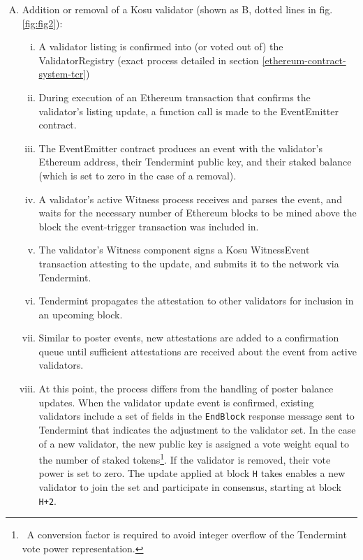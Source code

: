\documentclass[10pt]{article}
\begin{document}
\begin{enumerate}[A.]
\begin{enumerate}[i.]
  \end{enumerate}
  \item Addition or removal of a Kosu validator (shown as B, dotted lines in fig. \ref{fig:fig2}):
  \begin{enumerate}[i.]
    \item A validator listing is confirmed into (or voted out of) the ValidatorRegistry (exact process detailed in section \ref{ethereum-contract-system-tcr})
    \item During execution of an Ethereum transaction that confirms the validator’s listing update, a function call is made to the EventEmitter contract.
    \item The EventEmitter contract produces an event with the validator’s Ethereum address, their Tendermint public key, and their staked balance (which is set to zero in the case of a removal).
    \item A validator’s active Witness process receives and parses the event, and waits for the necessary number of Ethereum blocks to be mined above the block the event-trigger transaction was included in.
    \item The validator’s Witness component signs a Kosu WitnessEvent transaction attesting to the update, and submits it to the network via Tendermint.
    \item Tendermint propagates the attestation to other validators for inclusion in an upcoming block. 
    \item Similar to poster events, new attestations are added to a confirmation queue until sufficient attestations are received about the event from active validators.
    \item At this point, the process differs from the handling of poster balance updates. When the validator update event is confirmed, existing validators include a set of fields in the \texttt{EndBlock} response message sent to Tendermint that indicates the adjustment to the validator set. In the case of a new validator, the new public key is assigned a vote weight equal to the number of staked tokens\footnote{\ A conversion factor is required to avoid integer overflow of the Tendermint vote power representation.}. If the validator is removed, their vote power is set to zero. The update applied at block \texttt{H} takes enables a new validator to join the set and participate in consensus, starting at block \texttt{H+2}\cite{tendermint-abci-spec}.
  \end{enumerate} 
\end{enumerate}
\end{document}
